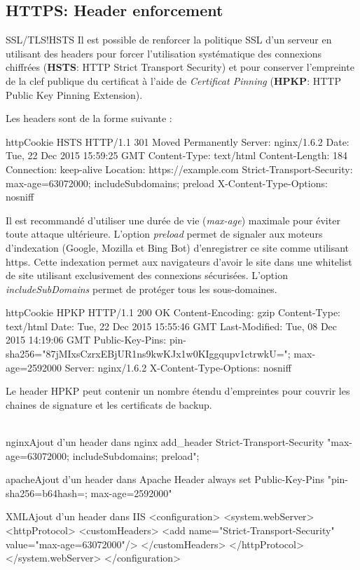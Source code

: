 \documentclass[twoside,a4paper,12pt,titlepage]{book}
\begin{document}
\subsection{HTTPS: Header enforcement}
\begin{Define}{SSL/TLS!HSTS}
Il est possible de renforcer la politique SSL d'un serveur en utilisant des headers pour forcer l'utilisation systématique des connexions chiffrées (\textbf{HSTS}: HTTP Strict Transport Security) et pour conserver l'empreinte de la clef publique du certificat à l'aide de \textit{Certificat Pinning} (\textbf{HPKP}: HTTP Public Key Pinning Extension).
\end{Define}
Les headers sont de la forme suivante :
\begin{Config}{http}{Cookie HSTS}
HTTP/1.1 301 Moved Permanently
Server: nginx/1.6.2
Date: Tue, 22 Dec 2015 15:59:25 GMT
Content-Type: text/html
Content-Length: 184
Connection: keep-alive
Location: https://example.com
Strict-Transport-Security: max-age=63072000; includeSubdomains; preload
X-Content-Type-Options: nosniff
\end{Config}
Il est recommandé d'utiliser une durée de vie (\textit{max-age}) maximale pour éviter toute attaque ultérieure. L'option \textit{preload} permet de signaler aux moteurs d'indexation (Google, Mozilla et Bing Bot) d'enregistrer ce site comme utilisant https. Cette indexation permet aux navigateurs d'avoir le site dans une whitelist de site utilisant exclusivement des connexions sécurisées. L'option \textit{includeSubDomains} permet de protéger tous les sous-domaines.

\begin{Config}{http}{Cookie HPKP}
HTTP/1.1 200 OK
Content-Encoding: gzip
Content-Type: text/html
Date: Tue, 22 Dec 2015 15:55:46 GMT
Last-Modified: Tue, 08 Dec 2015 14:19:06 GMT
Public-Key-Pins: pin-sha256="87jMIxsCzrxEBjUR1ns9kwKJx1w0KIggqupv1ctrwkU="; max-age=2592000
Server: nginx/1.6.2
X-Content-Type-Options: nosniff
\end{Config}

Le header HPKP peut contenir un nombre étendu d'empreintes pour couvrir les chaines de signature et les certificats de backup.\\
 \\
\begin{Config}{nginx}{Ajout d'un header dans nginx}
add_header Strict-Transport-Security "max-age=63072000; includeSubdomains; preload"; 
\end{Config}
\begin{Config}{apache}{Ajout d'un header dans Apache}
Header always set Public-Key-Pins "pin-sha256=b64hash=; max-age=2592000"
\end{Config}
\begin{Config}{XML}{Ajout d'un header dans IIS}
<configuration>
    <system.webServer>
        <httpProtocol>
            <customHeaders>
            	<add name="Strict-Transport-Security" value="max-age=63072000"/>
            </customHeaders>
        </httpProtocol>
    </system.webServer>
</configuration>
\end{Config}
\end{document}
